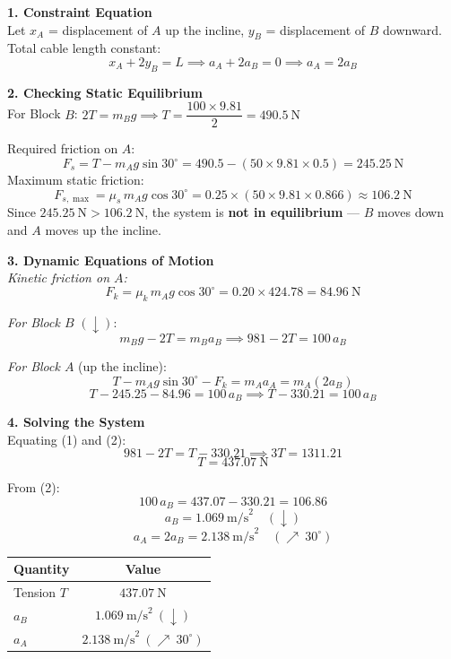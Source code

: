 \documentclass[12pt,a3paper]{article}
\begin{document}
\begin{enumerate}
\begin{tcolorbox}[enhanced,breakable,ansbox,colback=cG!4,colframe=cG,
  boxrule=0.8pt,arc=5pt,
  title={\textbf{Solution}},fonttitle=\bfseries\color{white},
  colbacktitle=cG]
\textbf{1. Constraint Equation}\\[4pt]
Let $x_A$ = displacement of $A$ up the incline, $y_B$ = displacement
of $B$ downward. Total cable length constant:
\[
  x_A + 2y_B = L \implies a_A + 2a_B = 0
  \implies \boxed{a_A = 2a_B}
\]

\medskip
\textbf{2. Checking Static Equilibrium}\\[4pt]
For Block $B$: \quad $2T = m_B g \implies T = \dfrac{100 \times 9.81}{2} = 490.5\ \text{N}$

Required friction on $A$:
\[
  F_s = T - m_A g\sin30^\circ = 490.5 - (50 \times 9.81 \times 0.5) = 245.25\ \text{N}
\]
Maximum static friction:
\[
  F_{s,\max} = \mu_s\,m_A g\cos30^\circ
             = 0.25 \times (50 \times 9.81 \times 0.866)
             \approx 106.2\ \text{N}
\]
Since $245.25\ \text{N} > 106.2\ \text{N}$, the system is \textbf{not in
equilibrium} — $B$ moves down and $A$ moves up the incline.

\medskip
\textbf{3. Dynamic Equations of Motion}\\[4pt]

\textit{Kinetic friction on $A$:}
\[
  F_k = \mu_k\,m_A g\cos30^\circ = 0.20 \times 424.78 = 84.96\ \text{N}
\]

\textit{For Block $B$} $(\downarrow)$:
\[
  m_B g - 2T = m_B a_B
  \implies 981 - 2T = 100\,a_B \tag{1}
\]

\textit{For Block $A$} (up the incline):
\[
  T - m_A g\sin30^\circ - F_k = m_A a_A = m_A(2a_B)
\]
\[
  T - 245.25 - 84.96 = 100\,a_B
  \implies T - 330.21 = 100\,a_B \tag{2}
\]

\medskip
\textbf{4. Solving the System}\\[4pt]
Equating (1) and (2):
\[
  981 - 2T = T - 330.21
  \implies 3T = 1311.21
\]
\[
  \boxed{T = 437.07\ \text{N}}
\]

From (2):
\[
  100\,a_B = 437.07 - 330.21 = 106.86
\]
\[
  \boxed{a_B = 1.069\ \text{m/s}^2 \quad (\downarrow)}
\]
\[
  \boxed{a_A = 2a_B = 2.138\ \text{m/s}^2 \quad (\nearrow\ 30^\circ)}
\]

\medskip
\begin{center}
\renewcommand{\arraystretch}{1.4}
\begin{tabular}{lc}
  \hline
  \textbf{Quantity} & \textbf{Value} \\
  \hline
  Tension $T$  & $437.07\ \text{N}$ \\
  $a_B$        & $1.069\ \text{m/s}^2\ (\downarrow)$ \\
  $a_A$        & $2.138\ \text{m/s}^2\ (\nearrow\ 30^\circ)$ \\
  \hline
\end{tabular}
\end{center}


\end{tcolorbox}
\end{enumerate}
\end{document}
